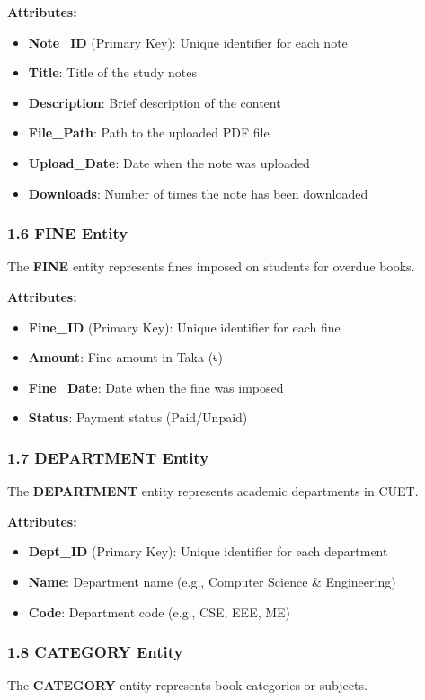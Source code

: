\documentclass[12pt,a4paper]{article}
\begin{document}
\textbf{Attributes:}
\begin{itemize}
    \item \textbf{Note\_ID} (Primary Key): Unique identifier for each note
    \item \textbf{Title}: Title of the study notes
    \item \textbf{Description}: Brief description of the content
    \item \textbf{File\_Path}: Path to the uploaded PDF file
    \item \textbf{Upload\_Date}: Date when the note was uploaded
    \item \textbf{Downloads}: Number of times the note has been downloaded
\end{itemize}

\subsubsection{1.6 FINE Entity}
The \textbf{FINE} entity represents fines imposed on students for overdue books.

\textbf{Attributes:}
\begin{itemize}
    \item \textbf{Fine\_ID} (Primary Key): Unique identifier for each fine
    \item \textbf{Amount}: Fine amount in Taka (৳)
    \item \textbf{Fine\_Date}: Date when the fine was imposed
    \item \textbf{Status}: Payment status (Paid/Unpaid)
\end{itemize}

\subsubsection{1.7 DEPARTMENT Entity}
The \textbf{DEPARTMENT} entity represents academic departments in CUET.

\textbf{Attributes:}
\begin{itemize}
    \item \textbf{Dept\_ID} (Primary Key): Unique identifier for each department
    \item \textbf{Name}: Department name (e.g., Computer Science \& Engineering)
    \item \textbf{Code}: Department code (e.g., CSE, EEE, ME)
\end{itemize}

\subsubsection{1.8 CATEGORY Entity}
The \textbf{CATEGORY} entity represents book categories or subjects.
\end{document}
